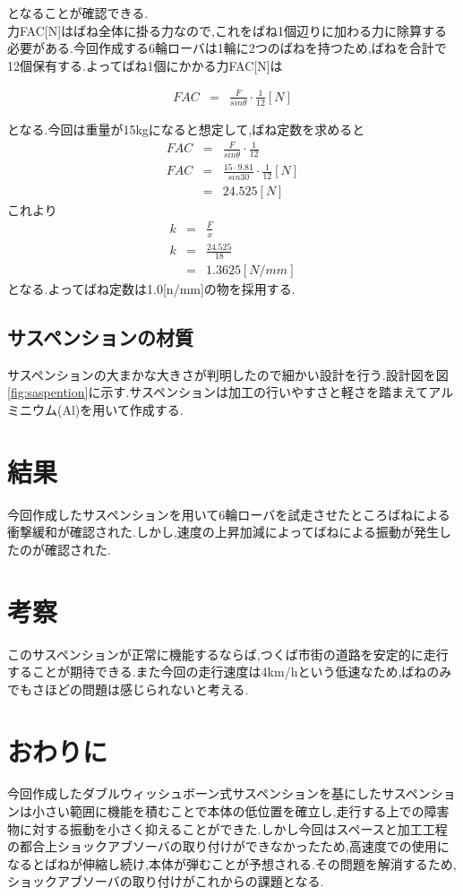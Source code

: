 \documentclass[11pt]{jsarticle}
\begin{document}
となることが確認できる.　\\
力FAC[N]はばね全体に掛る力なので,これをばね1個辺りに加わる力に除算する必要がある.今回作成する6輪ローバは1輪に2つのばねを持つため,ばねを合計で12個保有する.よってばね1個にかかる力FAC[N]は

\begin{eqnarray}
	FAC & = & \frac{F}{sinθ}\cdot \frac{1}{12} [N]
\end{eqnarray}

となる.今回は重量が15kgになると想定して,ばね定数を求めると
\begin{eqnarray}
	FAC & = & \frac{F}{sinθ}\cdot \frac{1}{12} \\
	FAC & = & \frac{15 \cdot  9.81}{sin30}\cdot \frac{1}{12} [N] \\
	     & =& 24.525[N] 
\end{eqnarray}
	{これより}　
\begin{eqnarray}
	k& = &  \frac{F}{x} \\
	k& = &  \frac{24.525}{18} \\
	 & = & 1.3625 [N/mm]
\end{eqnarray}
となる.よってばね定数は1.0[n/mm]の物を採用する.


\subsection{サスペンションの材質}
サスペンションの大まかな大きさが判明したので細かい設計を行う.設計図を図\ref{fig:saspention}に示す.サスペンションは加工の行いやすさと軽さを踏まえてアルミニウム(Al)を用いて作成する.

\section{結果}
今回作成したサスペンションを用いて6輪ローバを試走させたところばねによる衝撃緩和が確認された.しかし,速度の上昇加減によってばねによる振動が発生したのが確認された.

\section{考察}
このサスペンションが正常に機能するならば,つくば市街の道路を安定的に走行することが期待できる.また今回の走行速度は4km/hという低速なため,ばねのみでもさほどの問題は感じられないと考える.

\section{おわりに}
今回作成したダブルウィッシュボーン式サスペンションを基にしたサスペンションは小さい範囲に機能を積むことで本体の低位置を確立し,走行する上での障害物に対する振動を小さく抑えることができた.しかし今回はスペースと加工工程の都合上ショックアブソーバの取り付けができなかったため,高速度での使用になるとばねが伸縮し続け,本体が弾むことが予想される.その問題を解消するため,ショックアブソーバの取り付けがこれからの課題となる.
\end{document}
